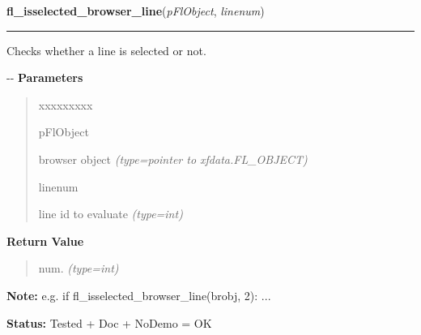 \hspace{.8\funcindent}\begin{boxedminipage}{\funcwidth}

    \raggedright \textbf{fl\_isselected\_browser\_line}(\textit{pFlObject}, \textit{linenum})

    \vspace{-1.5ex}

    \rule{\textwidth}{0.5\fboxrule}
\setlength{\parskip}{2ex}

Checks whether a line is selected or not.

-{}-
\setlength{\parskip}{1ex}
      \textbf{Parameters}
      \vspace{-1ex}

      \begin{quote}
        \begin{Ventry}{xxxxxxxxx}

          \item[pFlObject]


browser object
            {\it (type=pointer to xfdata.FL\_OBJECT)}

          \item[linenum]


line id to evaluate
            {\it (type=int)}

        \end{Ventry}

      \end{quote}

      \textbf{Return Value}
    \vspace{-1ex}

      \begin{quote}

num.
      {\it (type=int)}

      \end{quote}

\textbf{Note:} 
e.g. if fl\_isselected\_browser\_line(brobj, 2): ...


\textbf{Status:} 
Tested + Doc + NoDemo = OK


    \end{boxedminipage}

    \label{xformslib:flbrowser:fl_get_browser_topline}

    \vspace{0.5ex}


